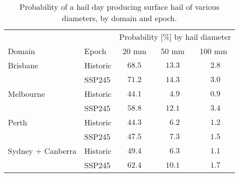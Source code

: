 \begin{table}

\caption{\label{tab:hail_probs}Probability of a hail day producing surface hail of various diameters,  by domain and epoch.}
\centering
\begin{tabular}{llccc}
\hline
& & \multicolumn{3}{c}{Probability [\%] by hail diameter} \\ 
Domain & Epoch & 20 mm & 50 mm & \multicolumn{1}{c}{100 mm} \\ 
\hline
Brisbane & Historic  & $68.5$ & $13.3$ & $\phantom{0}2.8$ \\
 & SSP245  & $71.2$ & $14.3$ & $\phantom{0}3.0$ \\
Melbourne & Historic  & $44.1$ & $\phantom{0}4.9$ & $\phantom{0}0.9$ \\
 & SSP245  & $58.8$ & $12.1$ & $\phantom{0}3.4$ \\
Perth & Historic  & $44.3$ & $\phantom{0}6.2$ & $\phantom{0}1.2$ \\
 & SSP245  & $47.5$ & $\phantom{0}7.3$ & $\phantom{0}1.5$ \\
Sydney + Canberra & Historic  & $49.4$ & $\phantom{0}6.3$ & $\phantom{0}1.1$ \\
 & SSP245  & $62.4$ & $10.1$ & $\phantom{0}1.7$ \\
\hline 
\end{tabular}

\end{table}
